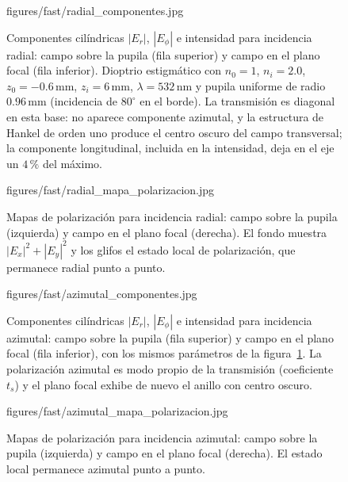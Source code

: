 \begin{figure}[!htbp]
  \centering
    {figures/fast/radial_componentes.jpg}
  \caption{Componentes cilíndricas $|E_r|$, $|E_\phi|$ e intensidad para incidencia radial: campo sobre la pupila (fila superior) y campo en el plano focal (fila inferior). Dioptrio estigmático con $n_0=1$, $n_i=2.0$, $z_0=-0.6\,\mathrm{mm}$, $z_i=6\,\mathrm{mm}$, $\lambda=532\,\mathrm{nm}$ y pupila uniforme de radio $0.96\,\mathrm{mm}$ (incidencia de $80^\circ$ en el borde). La transmisión es diagonal en esta base: no aparece componente azimutal, y la estructura de Hankel de orden uno produce el centro oscuro del campo transversal; la componente longitudinal, incluida en la intensidad, deja en el eje un $4\,\%$ del máximo.}
  \label{fig:radial-plano-focal-componentes}
\end{figure}

\begin{figure}[!htbp]
  \centering
    {figures/fast/radial_mapa_polarizacion.jpg}
  \caption{Mapas de polarización para incidencia radial: campo sobre la pupila (izquierda) y campo en el plano focal (derecha). El fondo muestra $|E_x|^2+|E_y|^2$ y los glifos el estado local de polarización, que permanece radial punto a punto.}
  \label{fig:radial-plano-focal-mapa-polarizacion}
\end{figure}

\begin{figure}[!htbp]
  \centering
    {figures/fast/azimutal_componentes.jpg}
  \caption{Componentes cilíndricas $|E_r|$, $|E_\phi|$ e intensidad para incidencia azimutal: campo sobre la pupila (fila superior) y campo en el plano focal (fila inferior), con los mismos parámetros de la figura~\ref{fig:radial-plano-focal-componentes}. La polarización azimutal es modo propio de la transmisión (coeficiente $t_s$) y el plano focal exhibe de nuevo el anillo con centro oscuro.}
  \label{fig:azimutal-plano-focal-componentes}
\end{figure}

\begin{figure}[!htbp]
  \centering
    {figures/fast/azimutal_mapa_polarizacion.jpg}
  \caption{Mapas de polarización para incidencia azimutal: campo sobre la pupila (izquierda) y campo en el plano focal (derecha). El estado local permanece azimutal punto a punto.}
  \label{fig:azimutal-plano-focal-mapa-polarizacion}
\end{figure}

